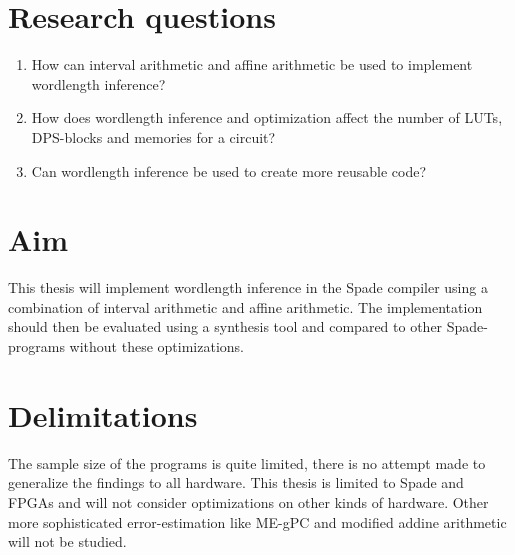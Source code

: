 \section{Research questions}
\begin{enumerate}
  \item How can interval arithmetic and affine arithmetic be used to implement wordlength inference?
  \item How does wordlength inference and optimization affect the number of LUTs, DPS-blocks and memories for a circuit?
  \item Can wordlength inference be used to create more reusable code?
\end{enumerate}

\section{Aim}
This thesis will implement wordlength inference in the Spade compiler using a combination of interval arithmetic and affine arithmetic. The implementation should then be evaluated using a synthesis tool and compared to other Spade-programs without these optimizations.

\section{Delimitations}
The sample size of the programs is quite limited, there is no attempt made to generalize the findings to all hardware. This thesis is limited to Spade and FPGAs and will not consider optimizations on other kinds of hardware. Other more sophisticated error-estimation like ME-gPC and modified addine arithmetic will not be studied.
